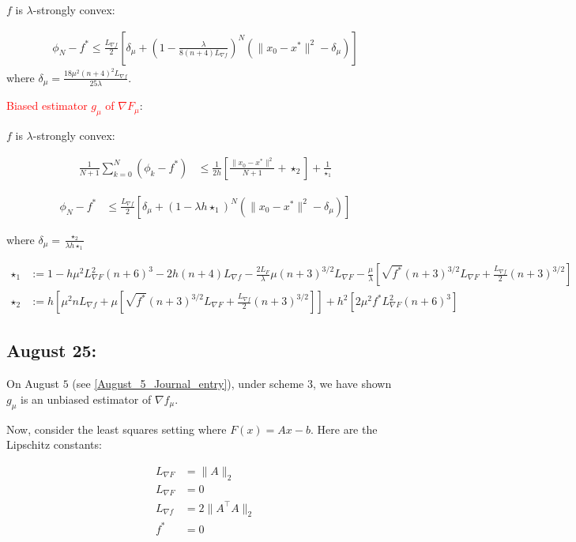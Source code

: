 \documentclass{article}
\begin{document}
$f$ is $\lambda$-strongly convex: 

\begin{align*}
\phi_N - f^* \leq \frac{L_{\nabla f}}{2}\left[\delta_{\mu} + \left(1 - \frac{\lambda}{8(n+4)L_{\nabla f}}\right)^N(\|x_0-x^*\|^2 - \delta_{\mu})\right]
\end{align*}
where $\delta_{\mu} = \frac{18\mu^2(n+4)^2L_{\nabla f}}{25 \lambda}$. \newline 

\textcolor{red}{Biased estimator $g_{\mu}$ of $\nabla F_{\mu}$}: \newline 

$f$ is $\lambda$-strongly convex: 

\begin{align*}
\frac{1}{N+1}\sum_{k=0}^N (\phi_k - f^*) & \leq \frac{1}{2h}\left[\frac{\|x_0 - x^*\|^2}{N+1} + \star_2\right] + \frac{1}{\star_1}
\end{align*}

\begin{align*}
\phi_N - f^* & \leq \frac{L_{\nabla f}}{2}[\delta_{\mu} + (1-\lambda h \star_1)^N(\|x_0 - x^*\|^2 - \delta_{\mu})]
\end{align*}

where $\delta_{\mu} = \frac{\star_2}{\lambda h \star_1}$ \newline 

\begin{align*}
\star_1 & := 1 - h\mu^2L_{\nabla F}^2(n+6)^3 - 2h(n+4)L_{\nabla f} - \frac{2L_F}{\lambda}\mu(n+3)^{3/2}L_{\nabla F} -\frac{\mu}{\lambda}\left[\sqrt{f^*}(n+3)^{3/2}L_{\nabla F} + \frac{L_{\nabla f}}{2}(n+3)^{3/2}\right] \\ \star_2 & := h\left[\mu^2nL_{\nabla f} + \mu\left[\sqrt{f^*}(n+3)^{3/2}L_{\nabla F} + \frac{L_{\nabla f}}{2}(n+3)^{3/2}\right]\right] + h^2[2\mu^2f^*L_{\nabla F}^2(n+6)^3] 
\end{align*}

\subsection{August 25:}

On August $5$ (see \ref{August_5_Journal_entry}), under scheme $3$, we have shown $g_{\mu}$ is an unbiased estimator of $\nabla f_{\mu}$. \newline 

Now, consider the least squares setting where $F(x) = Ax-b$. Here are the Lipschitz constants:

\begin{align*}
L_{\nabla F} & = \|A\|_2 \\ L_{\nabla F} & = 0 \\ L_{\nabla f} & = 2\|A^\top A\|_2 \\ f^* & = 0
\end{align*}
\end{document}
